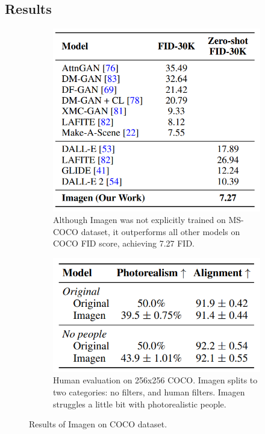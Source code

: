 \subsection{Results}

\begin{figure}[t!]
    \centering
    \begin{subfigure}{0.4\textwidth}
        \centering
        \includegraphics[width=0.6\linewidth]{images/imagen/imagen_coco_zeroshot.png}
        \caption{Although Imagen was not explicitly trained on MS-COCO dataset, it outperforms all other models on COCO FID score, achieving 7.27 FID.}
        \label{fig:imagen_coco_zeroshot}
    \end{subfigure}
    \begin{subfigure}{0.4\textwidth}
        \centering
        \includegraphics[width=0.6\linewidth]{images/imagen/imagen_coco_human_eval.png}
        \caption{Human evaluation on 256x256 COCO. Imagen splits to two categories: no filters, and human filters. Imagen struggles a little bit with photorealistic people.}
        \label{fig:imagen_coco_human_eval}
    \end{subfigure}
    \caption{Results of Imagen on COCO dataset.}
\end{figure}

